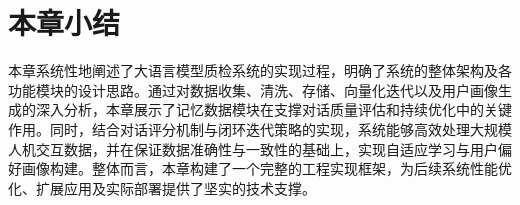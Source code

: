 \section{本章小结}
本章系统性地阐述了大语言模型质检系统的实现过程，明确了系统的整体架构及各功能模块的设计思路。通过对数据收集、清洗、存储、向量化迭代以及用户画像生成的深入分析，本章展示了记忆数据模块在支撑对话质量评估和持续优化中的关键作用。同时，结合对话评分机制与闭环迭代策略的实现，系统能够高效处理大规模人机交互数据，并在保证数据准确性与一致性的基础上，实现自适应学习与用户偏好画像构建。整体而言，本章构建了一个完整的工程实现框架，为后续系统性能优化、扩展应用及实际部署提供了坚实的技术支撑。